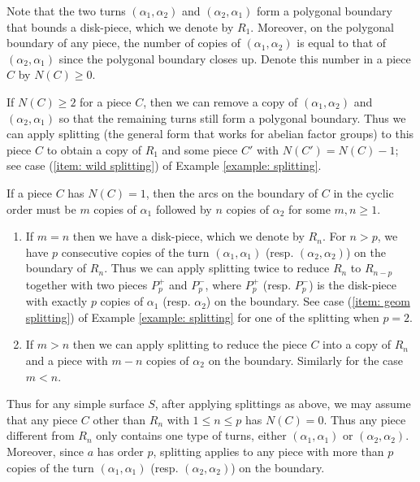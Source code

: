\documentclass{amsart}
\theoremstyle{definition}
\numberwithin{equation}{section}
\theoremstyle{theorem}
\theoremstyle{remark}
\begin{document}
	Note that the two turns $(\alpha_1,\alpha_2)$ and $(\alpha_2,\alpha_1)$ form a polygonal boundary that bounds a disk-piece, which we denote by $R_1$. Moreover, on the polygonal boundary of any piece, the number of copies of $(\alpha_1,\alpha_2)$ is equal to that of $(\alpha_2,\alpha_1)$ since the polygonal boundary closes up. Denote this number in a piece $C$ by $N(C)\ge0$.
	
	If $N(C)\ge2$ for a piece $C$, then we can remove a copy of $(\alpha_1,\alpha_2)$ and $(\alpha_2,\alpha_1)$ so that the remaining turns still form a polygonal boundary.
	Thus we can apply splitting (the general form that works for abelian factor groups) to this piece $C$ to obtain a copy of $R_1$ and some piece $C'$ with $N(C')=N(C)-1$; see case (\ref{item: wild splitting}) of Example \ref{example: splitting}.
	
	If a piece $C$ has $N(C)=1$, then the arcs on the boundary of $C$ in the cyclic order must be $m$ copies of $\alpha_1$ followed by $n$ copies of $\alpha_2$ for some $m,n\ge1$. 
	\begin{enumerate}
	    \item If $m=n$ then we have a disk-piece, which we denote by $R_n$. For $n>p$, we have $p$ consecutive copies of the turn $(\alpha_1,\alpha_1)$ (resp. $(\alpha_2,\alpha_2)$) on the boundary of $R_n$. Thus we can apply splitting twice to reduce $R_n$ to $R_{n-p}$ together with two pieces $P_p^+$ and $P_p^-$,
	    where $P_p^+$ (resp. $P_p^-$) is the disk-piece with exactly $p$ copies of $\alpha_1$ (resp. $\alpha_2$) on the boundary. See case (\ref{item: geom splitting}) of Example \ref{example: splitting} for one of the splitting when $p=2$.
	    \item If $m>n$ then we can apply splitting to reduce the piece $C$ into a copy of $R_n$ and a piece with $m-n$ copies of $\alpha_2$ on the boundary. Similarly for the case $m<n$.
	\end{enumerate}
	
	Thus for any simple surface $S$, after applying splittings as above, we may assume that any piece $C$ other than $R_n$ with $1\le n\le p$ has $N(C)=0$. Thus any piece different from $R_n$ only contains one type of turns, either $(\alpha_1,\alpha_1)$ or $(\alpha_2,\alpha_2)$.
	Moreover, since $a$ has order $p$, splitting applies to any piece with more than $p$ copies of the turn $(\alpha_1,\alpha_1)$ (resp. $(\alpha_2,\alpha_2)$) on the boundary.
	
\end{document}
